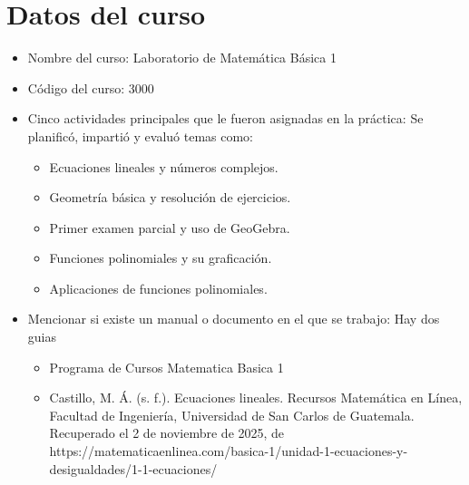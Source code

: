 \documentclass[12pt]{article}
\begin{document}
	\section*{Datos del curso}
	\begin{itemize}[label=$\blacksquare$]
		\item Nombre del curso: Laboratorio de Matemática Básica 1
		\item Código del curso: 3000
		\item Cinco actividades principales que le fueron asignadas en la práctica: Se planificó, impartió y evaluó temas como:
		\begin{itemize}
			\item Ecuaciones lineales y números complejos.
			\item Geometría básica y resolución de ejercicios.
			\item Primer examen parcial y uso de GeoGebra.
			\item Funciones polinomiales y su graficación.
			\item Aplicaciones de funciones polinomiales.
		\end{itemize}
		
		
		\item Mencionar si existe un manual o documento en el que se trabajo:  Hay dos guias 
		\begin{itemize}
			\item Programa de Cursos Matematica Basica 1
			\item Castillo, M. Á. (s. f.). Ecuaciones lineales. Recursos Matemática en Línea, Facultad de Ingeniería, Universidad de San Carlos de Guatemala. Recuperado el 2 de noviembre de 2025, de https://matematicaenlinea.com/basica-1/unidad-1-ecuaciones-y-desigualdades/1-1-ecuaciones/
			
		\end{itemize}
		
	\end{itemize}
	
\end{document}
